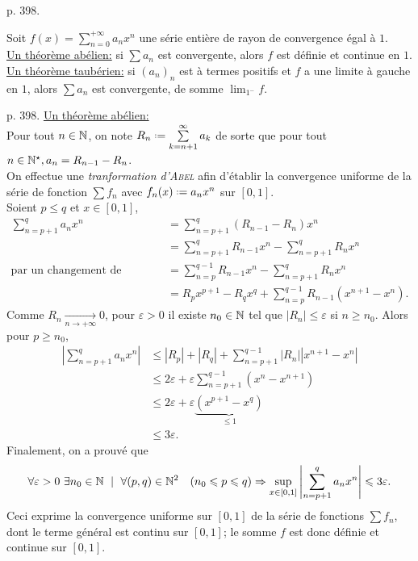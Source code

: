 \cite{exos_oraux} p. 398.

\begin{theo}

Soit $f(x) = \sum\limits_{n=0}^{+\infty} a_n x^n$ une série entière de rayon de convergence égal à $1$. \\
\underline{Un théorème abélien:} si $\sum a_n$ est convergente, alors $f$ est définie et continue en $1$. \\
\underline{Un théorème taubérien:} si $(a_n)_n$ est à termes positifs et $f$ a une limite à gauche en $1$, alors $\sum a_n$ est convergente, de somme $\displaystyle \lim_{1^-}f$.
\end{theo}

\begin{preuve} \cite{exos_oraux} p. 398.
    \underline{Un théorème abélien:} \\
    Pour tout $n \in \mathbb{N}$, on note $R_n \defeq \sum\limits_{k = n+1}^{\infty} a_k$ de sorte que pour tout $n \in \mathbb{N}^\star, a_n = R_{n-1} - R_n$. \\
    On effectue une \emph{tranformation d'\textsc{Abel}} afin d'établir la convergence uniforme de la série de fonction $\sum f_n$ avec $f_n(x) \defeq a_n x^n$ sur $[0, 1]$. \\
    Soient $p \leqslant q$ et $x \in [0,1]$,
    \begin{align*}
        \sum_{n=p+1}^q a_n x^n &= \sum_{n=p+1}^q (R_{n-1} -R_n) x^n \\
        &= \sum_{n=p+1}^q R_{n-1} x^n - \sum_{n=p+1}^q R_n x^n \\
    \text{par un changement de variable} &= \sum_{n=p}^{q-1} R_{n-1} x^n - \sum_{n=p+1}^q R_n x^n \\
    &= R_px^{p+1} - R_q x^q + \sum_{n=p}^{q-1} R_{n-1} (x^{n+1}-x^n).
    \end{align*}
    Comme $R_n \xrightarrow[n \to +\infty]{}0$, pour $\varepsilon > 0$ il existe $n_0 \in \mathbb{N}$ tel que $|R_n| \leqslant \varepsilon$ si $n \geqslant n_0$. Alors pour $p \geqslant n_0$, 
    \begin{align*}
        \left| \sum_{n=p+1}^q a_n x^n \right| &\leqslant |R_p| + |R_q| + \sum_{n=p+1}^{q-1} |R_n||x^{n+1}-x^n| \\
        &\leqslant 2 \varepsilon + \varepsilon \sum_{n=p+1}^{q-1} (x^n-x^{n+1}) \\
        &\leqslant 2 \varepsilon + \varepsilon \underbrace{(x^{p+1}-x^q)}_{\leqslant 1} \\
        &\leqslant 3 \varepsilon.
    \end{align*}
    Finalement, on a prouvé que
    $$\forall \varepsilon > 0\ \exists n_0 \in \mathbb{N}\ \mid\ \forall(p,q) \in \mathbb{N}^2 \quad (n_0 \leqslant p \leqslant q) \Rightarrow \sup_{x \in [0, 1]} \left| \sum_{n=p+1}^q a_n x^n \right| \leqslant 3 \varepsilon.$$
    Ceci exprime la convergence uniforme sur $[0, 1]$ de la série de fonctions $\sum f_n$, dont le terme général est continu sur $[0,1]$; le somme $f$ est donc définie et continue sur $[0, 1]$.
\end{preuve}